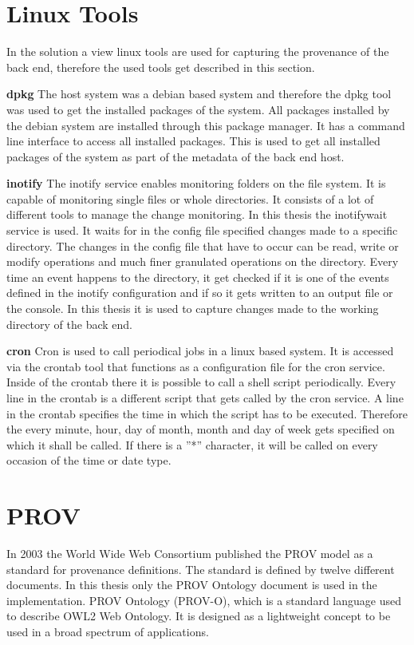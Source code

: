 \documentclass[draft,final]{vutinfth} %
\begin{document}
\section{Linux Tools}\label{Linux Tools}
In the solution a view linux tools are used for capturing the provenance of the back end, therefore the used tools get described in this section. 

\textbf{dpkg}
The host system was a debian based system and therefore the dpkg tool was used to get the installed packages of the system. All packages installed by the debian system are installed through this package manager. It has a command line interface to access all installed packages. This is used to get all installed packages of the system as part of the metadata of the back end host.\cite{dpkg}

\textbf{inotify}
The inotify service enables monitoring folders on the file system. It is capable of monitoring single files or whole directories.\cite{inotify} It consists of a lot of different tools to manage the change monitoring. In this thesis the inotifywait service is used. It waits for in the config file specified changes made to a specific directory. The changes in the config file that have to occur can be read, write or modify operations and much finer granulated operations on the directory. Every time an event happens to the directory, it get checked if it is one of the events defined in the inotify configuration and if so it gets written to an output file or the console. \cite{inotifywait} In this thesis it is used to capture changes made to the working directory of the back end. 

\textbf{cron}
Cron is used to call periodical jobs in a linux based system. It is accessed via the crontab tool that functions as a configuration file for the cron service. Inside of the crontab there it is possible to call a shell script periodically. Every line in the crontab is a different script that gets called by the cron service. A line in the crontab specifies the time in which the script has to be executed. Therefore the every minute, hour, day of month, month and day of week gets specified on which it shall be called. If there is a ”*” character, it will be called on every occasion of the time or date type. \cite{crontab}

\section{PROV}\label{PROV}
In 2003 the World Wide Web Consortium published the PROV model as a standard for provenance definitions.  The standard is defined by twelve different documents. In this thesis only the PROV Ontology document is used in the implementation. \cite{f06eee9045b445be89cf07100b3ce05c}
PROV Ontology (PROV-O), which is a standard language used to describe OWL2 Web Ontology. It is designed as a lightweight concept to be used in a broad spectrum of applications. 
\end{document}
